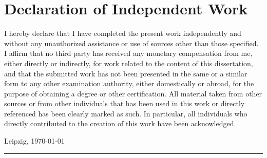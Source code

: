 
\clearpage
\thispagestyle{empty}

\section*{Declaration of Independent Work}

I hereby declare that I have completed the present work independently and without any unauthorized assistance or use of sources other than those specified. I affirm that no third party has received any monetary compensation from me, either directly or indirectly, for work related to the content of this dissertation, and that the submitted work has not been presented in the same or a similar form to any other examination authority, either domestically or abroad, for the purpose of obtaining a degree or other certification. All material taken from other sources or from other individuals that has been used in this work or directly referenced has been clearly marked as such. In particular, all individuals who directly contributed to the creation of this work have been acknowledged.

\vspace{4\baselineskip}

\begin{center}
\begin{minipage}[t]{0.48\textwidth}
Leipzig, \today
\end{minipage} %
\begin{minipage}[t]{0.48\textwidth}
\vspace{0.1\baselineskip}
\rule{12em}{0.5pt} \\
\tAuthor
\end{minipage}
\end{center}
